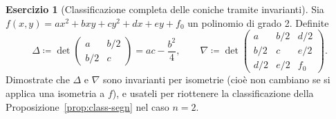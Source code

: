 \documentclass[11pt, a4paper]{book}
\theoremstyle{definition}
\newtheorem{esercizio}[definizione]{Esercizio}
\theoremstyle{plain}
\theoremstyle{remark}
\begin{document}
\begin{esercizio}[Classificazione completa delle coniche tramite invarianti]
Sia $f(x,y) = ax^2 + bxy + cy^2 + dx + ey + f_0$ un polinomio di grado 2. Definite
\[
  \Delta \coloneqq \det \begin{pmatrix} a & b/2 \\ b/2 & c \end{pmatrix} = ac - \frac{b^2}{4}, \qquad
  \nabla \coloneqq \det \begin{pmatrix} a & b/2 & d/2 \\ b/2 & c & e/2 \\ d/2 & e/2 & f_0 \end{pmatrix}.
\]
Dimostrate che $\Delta$ e $\nabla$ sono invarianti per isometrie (cioè non cambiano se si applica una isometria a $f$), e usateli per riottenere la classificazione della Proposizione~\ref{prop:class-segn} nel caso $n=2$.
\end{esercizio}
\end{document}
